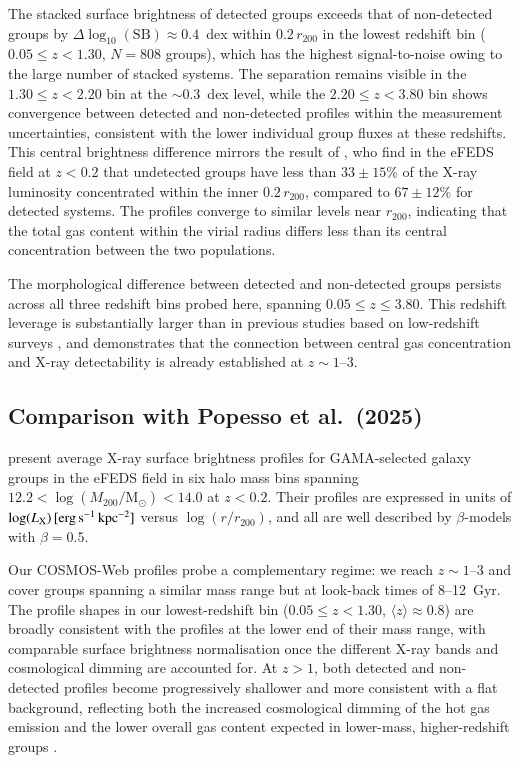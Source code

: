 \documentclass{aa}
\begin{document}
\begin{appendix}
The stacked surface brightness of detected groups exceeds that of
non-detected groups by $\Delta\log_{10}(\mathrm{SB}) \approx 0.4$~dex
within $0.2\,r_{200}$ in the lowest redshift bin ($0.05 \leq z < 1.30$,
$N = 808$ groups), which has the highest signal-to-noise owing to the
large number of stacked systems.  The separation remains visible in the
$1.30 \leq z < 2.20$ bin at the $\sim$0.3~dex level, while the
$2.20 \leq z < 3.80$ bin shows convergence between detected and
non-detected profiles within the measurement uncertainties, consistent
with the lower individual group fluxes at these redshifts.
This central brightness difference mirrors the result of
\citet{Popesso2025}, who find in the eFEDS field at $z < 0.2$ that
undetected groups have less than $33\pm15\%$ of the X-ray luminosity
concentrated within the inner $0.2\,r_{200}$, compared to $67\pm12\%$
for detected systems.  The profiles converge to similar levels near
$r_{200}$, indicating that the total gas content within the virial radius
differs less than its central concentration between the two populations.

The morphological difference between detected and non-detected groups
persists across all three redshift bins probed here, spanning
$0.05 \leq z \leq 3.80$.  This redshift leverage is substantially larger
than in previous studies based on low-redshift surveys
\citep[e.g.,][]{Popesso2024,Popesso2025}, and demonstrates that the
connection between central gas concentration and X-ray detectability
is already established at $z \sim 1$--3.

\subsection{Comparison with Popesso et al.\ (2025)}
\label{sec:profile_popesso_comparison}

\citet{Popesso2025} present average X-ray surface brightness profiles for
GAMA-selected galaxy groups in the eFEDS field in six halo mass bins spanning
$12.2 < \log(M_{200}/\mathrm{M_\odot}) < 14.0$ at $z < 0.2$.
Their profiles are expressed in units of $\log(L_{\rm X})\,[\mathrm{erg\,s^{-1}\,kpc^{-2}}]$
versus $\log(r/r_{200})$, and all are well described by $\beta$-models with
$\beta = 0.5$.

Our COSMOS-Web profiles probe a complementary regime: we reach
$z \sim 1$--3 and cover groups spanning a similar mass range but at
look-back times of 8--12~Gyr.  The profile shapes in our lowest-redshift
bin ($0.05 \leq z < 1.30$, $\langle z \rangle \approx 0.8$) are broadly
consistent with the \citet{Popesso2025} profiles at the lower end of their
mass range, with comparable surface brightness normalisation once
the different X-ray bands and cosmological dimming are accounted for.
At $z > 1$, both detected and non-detected profiles become progressively
shallower and more consistent with a flat background, reflecting both the
increased cosmological dimming of the hot gas emission and the lower overall
gas content expected in lower-mass, higher-redshift groups
\citep[see also][]{Sun2009,Lovisari2015}.


\end{appendix}
\end{document}
